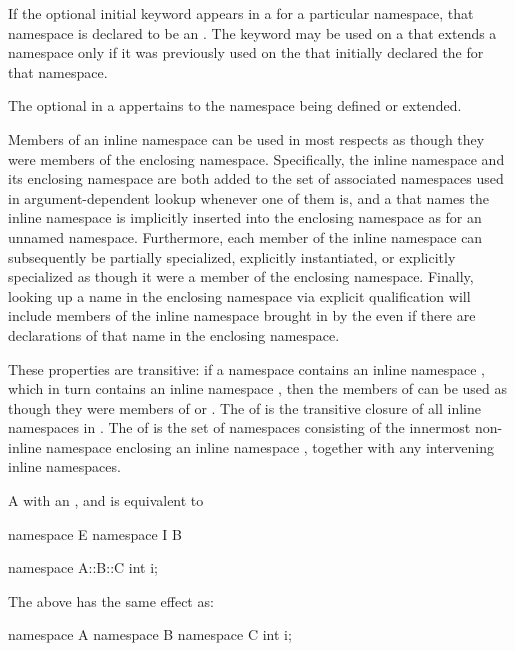 \pnum
If the optional initial  keyword appears in a
 for a particular namespace, that namespace is
declared to be an . The  keyword may be
used on a  that extends a namespace
only if it was previously used on the 
that initially declared the  for that namespace.

\pnum
The optional 
in a 
appertains to the namespace being defined or extended.

\pnum
Members of an inline namespace can be used in most respects as though they were members
of the enclosing namespace. Specifically, the inline namespace and its enclosing
namespace are both added to the set of associated namespaces used in
argument-dependent lookup whenever one of them is,
and a  that names the inline
namespace is implicitly inserted into the enclosing namespace as for an unnamed
namespace. Furthermore, each
member of the inline namespace can subsequently be partially
specialized, explicitly
instantiated, or explicitly specialized as
though it were a member of the enclosing namespace. Finally, looking up a name in the
enclosing namespace via explicit qualification will include
members of the inline namespace brought in by the  even if
there are declarations of that name in the enclosing namespace.

\pnum
These properties are transitive: if a namespace  contains an inline namespace
, which in turn contains an inline namespace , then the members of
 can be used as though they were members of  or .
The  of  is the transitive closure of all
inline namespaces in .
The  of  is the set of namespaces
consisting of the innermost non-inline namespace enclosing
an inline namespace , together with any intervening inline namespaces.

\pnum
A  with an
 ,
  and
 
is equivalent to
\begin{codeblock}
namespace E { namespace I { B } }
\end{codeblock}
\begin{example}
\begin{codeblock}
namespace A::B::C {
  int i;
}
\end{codeblock}
The above has the same effect as:
\begin{codeblock}
namespace A {
  namespace B {
    namespace C {
      int i;
    }
  }
}
\end{codeblock}
\end{example}

